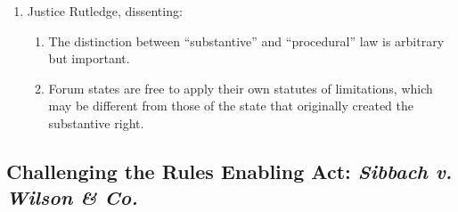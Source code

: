 \begin{enumerate}
\begin{enumerate}
        \item  Question: does the statute of limitations affect ``merely the manner and the means'' of the right to recover, or is it ``a matter of substance'' that affects the result of the litigation?
        \item \emph{Erie} did not intend to ``formulate scientific legal terminology'' around the terms ``substantive'' and ``procedural.'' It intended to ensure that outcomes of diversity cases in federal court would be similar to outcomes in state courts.
        \item The \emph{Erie} doctrine does not distinguish between cases at law and cases in equity.
        \item ``The source of substantive rights enforced by a federal court under diversity jurisdiction, it cannot be said too often, is the law of the States. Whenever that law is authoritatively declared by a State, whether its voice be the legislature or its highest court, such law ought to govern in litigation founded on that law, whether the forum of application is a State or a federal court and whether the remedies be sought at law or may be had in equity.''\footnote{Casebook p. 507.}
        \item The Court reversed the appellate. Remanded for hearings under the NY statute of limitations.
    \item The \textbf{``outcome determinative'' test}: would it significantly affect the outcome of the litigation for a federal court to disregard state law? If so, \emph{Erie} holds that the court should follow state law.
    \end{enumerate}
    \item Justice Rutledge, dissenting:
    \begin{enumerate}
        \item The distinction between ``substantive'' and ``procedural'' law is arbitrary but important.
        \item Forum states are free to apply their own statutes of limitations, which may be different from those of the state that originally created the substantive right.
    \end{enumerate}
\end{enumerate}

\subsection{Challenging the Rules Enabling Act: \emph{Sibbach v. Wilson \& Co.}}

